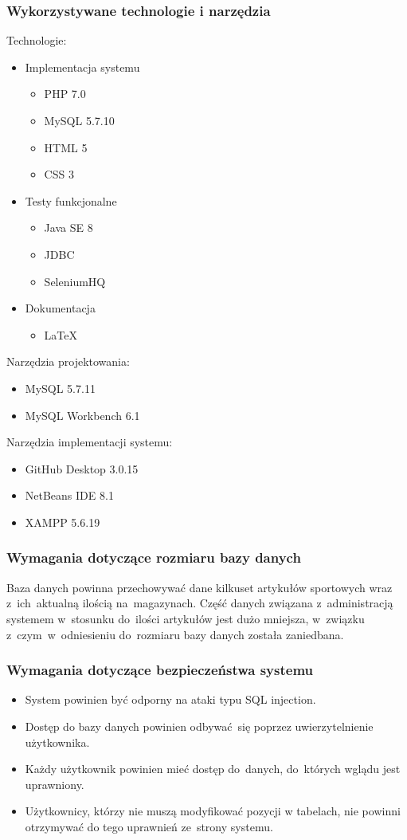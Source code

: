 \documentclass[a4paper, 12pt]{article}
\begin{document}
\subsubsection{Wykorzystywane technologie i narzędzia}
Technologie:
\begin{itemize}
	\item Implementacja systemu
	\begin{itemize}
		\item PHP 7.0
		\item MySQL 5.7.10
		\item HTML 5
		\item CSS 3
	\end{itemize}
	\item Testy funkcjonalne
	\begin{itemize}
		\item Java SE 8
		\item JDBC
		\item SeleniumHQ
	\end{itemize}
	\item Dokumentacja
	\begin{itemize}
		\item LaTeX
	\end{itemize}
\end{itemize}
Narzędzia projektowania:
\begin{itemize}
	\item MySQL 5.7.11
	\item MySQL Workbench 6.1
\end{itemize}
Narzędzia implementacji systemu:
\begin{itemize}
	\item GitHub Desktop 3.0.15
	\item NetBeans IDE 8.1
	\item XAMPP 5.6.19
\end{itemize}
\subsubsection{Wymagania dotyczące rozmiaru bazy danych}
Baza danych powinna przechowywać dane kilkuset artykułów sportowych wraz z~ich~aktualną ilością na~magazynach. Część danych związana z~administracją systemem w~stosunku do~ilości artykułów jest dużo mniejsza, w~związku z~czym~w~odniesieniu do~rozmiaru bazy danych została zaniedbana.
\subsubsection{Wymagania dotyczące bezpieczeństwa systemu}
\begin{itemize}
	\item System powinien być odporny na ataki typu SQL injection.
	\item Dostęp do bazy danych powinien odbywać~się poprzez uwierzytelnienie użytkownika.
	\item Każdy użytkownik powinien mieć dostęp do~danych, do~których wglądu jest uprawniony.
	\item Użytkownicy, którzy nie muszą modyfikować pozycji w tabelach, nie powinni otrzymywać do tego uprawnień ze~strony systemu.
\end{itemize}
\end{document}
